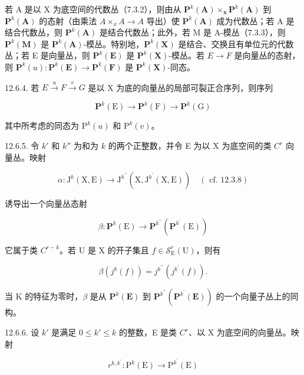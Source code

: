 若 A 是以 X 为底空间的代数丛（7.3.2），则由从 \(\mathbf{P}^{k}(\mathbf{A}) \times_{\mathbf{x}} \mathbf{P}^{k}(\mathbf{A})\) 到 \(\mathbf{P}^{k}(\mathbf{A})\) 的态射（由乘法 \(A \times_{x} A \to A\) 导出）使 \(\mathbf{P}^{k}(\mathbf{A})\) 成为代数丛；若 A 是结合代数丛，则 \(\mathbf{P}^{k}(\mathbf{A})\) 是结合代数丛；此外，若 M 是 A-模丛（7.3.3），则 \(\mathbf{P}^{k}(\mathbf{M})\) 是 \(\mathbf{P}^{k}(\mathbf{A})\)-模丛。特别地，\(\mathbf{P}^{k}(\mathbf{X})\) 是结合、交换且有单位元的代数丛；若 E 是向量丛，则 \(\mathbf{P}^{k}(\mathbf{E})\) 是 \(\mathbf{P}^{k}(\mathbf{X})\)-模丛。若 \(E \to F\) 是向量丛的态射，则 \(\mathbf{P}^{k}(u): \mathbf{P}^{k}(\mathbf{E}) \to \mathbf{P}^{k}(\mathbf{F})\) 是 \(\mathbf{P}^{k}(\mathbf{X})\)-同态。

12.6.4. 若 \(E \xrightarrow{u} F \xrightarrow{v} G\) 是以 X 为底的向量丛的局部可裂正合序列，则序列

\[
\mathbf {P} ^ {k} (\mathrm{E}) \rightarrow \mathbf {P} ^ {k} (\mathrm{F}) \rightarrow \mathbf {P} ^ {k} (\mathrm{G})
\]

其中所考虑的同态为 \(\mathrm{P}^{k}(u)\) 和 \(\mathrm{P}^{k}(v)\)。

12.6.5. 令 \(k'\) 和 \(k''\) 为和为 \(k\) 的两个正整数，并令 E 为以 X 为底空间的类 \(C^{r}\) 向量丛。映射

\[
\alpha \colon \mathrm{J} ^ {k} (\mathrm{X}, \mathrm{E}) \rightarrow \mathrm{J} ^ {k ^ {\prime \prime}} (\mathrm{X}, \mathrm{J} ^ {k ^ {\prime}} (\mathrm{X}, \mathrm{E})) \quad (\text { cf. } 1 2. 3. 8)
\]

诱导出一个向量丛态射

\[
\beta \colon \mathbf {P} ^ {k} (\mathrm{E}) \rightarrow \mathbf {P} ^ {k ^ {\prime \prime}} (\mathbf {P} ^ {k ^ {\prime}} (\mathrm{E}))
\]

它属于类 \(C^{r-k}\)。若 U 是 X 的开子集且 \(f\in\mathcal{S}_{\mathrm{E}}^{r}(\mathrm{U})\)，则有

\[
\beta (j ^ {k} (f)) = j ^ {k ^ {\prime \prime}} (j ^ {k ^ {\prime}} (f)).
\]

当 K 的特征为零时，\(\beta\) 是从 \(\mathbf{P}^{k}(\mathbf{E})\) 到 \(\mathbf{P}^{k^{\prime\prime}}(\mathbf{P}^{k^{\prime}}(\mathbf{E}))\) 的一个向量子丛上的同构。

12.6.6. 设 \(k'\) 是满足 \(0 \leqslant k' \leqslant k\) 的整数，E 是类 \(C^r\)、以 X 为底空间的向量丛。映射

\[
r ^ {k, k ^ {\prime}}: \mathrm{P} ^ {k} (\mathrm{E}) \rightarrow \mathrm{P} ^ {k ^ {\prime}} (\mathrm{E})
\]

